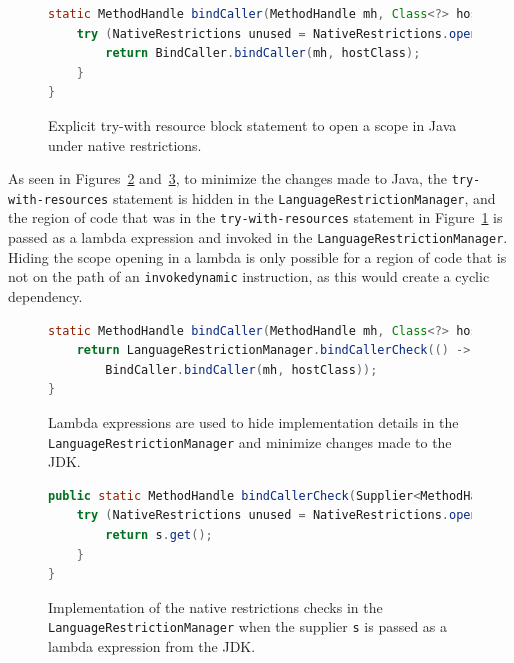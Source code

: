\begin{figure}[ht]
    \centering
\begin{lstlisting}[language=Java]
static MethodHandle bindCaller(MethodHandle mh, Class<?> hostClass) {
    try (NativeRestrictions unused = NativeRestrictions.openScope()) {
        return BindCaller.bindCaller(mh, hostClass);
    }
}
\end{lstlisting}
    \caption{Explicit try-with resource block statement to open a scope in Java under native restrictions.}
    \label{fig:bind_caller_twr}
\end{figure}

As seen in Figures~\ref{fig:bind_caller_lambda} and~\ref{fig:bind_caller_lrm}, to minimize the changes made to Java, the \verb|try-with-resources| statement is hidden in the \verb|LanguageRestrictionManager|, and the region of code that was in the \verb|try-with-resources| statement in Figure~\ref{fig:bind_caller_twr} is passed as a lambda expression and invoked in the \verb|LanguageRestrictionManager|. Hiding the scope opening in a lambda is only possible for a region of code that is not on the path of an \verb|invokedynamic| instruction, as this would create a cyclic dependency. 

\begin{figure}[ht]
    \centering
\begin{lstlisting}[language=Java]
static MethodHandle bindCaller(MethodHandle mh, Class<?> hostClass) {
    return LanguageRestrictionManager.bindCallerCheck(() -> 
        BindCaller.bindCaller(mh, hostClass));
}
\end{lstlisting}
    \caption{Lambda expressions are used to hide implementation details in the \texttt{LanguageRestrictionManager} and minimize changes made to the JDK.}
    \label{fig:bind_caller_lambda}
\end{figure}

\begin{figure}[ht]
    \centering
\begin{lstlisting}[language=Java]
public static MethodHandle bindCallerCheck(Supplier<MethodHandle> s) {
    try (NativeRestrictions unused = NativeRestrictions.openScope()) {
        return s.get();
    }
}
\end{lstlisting}
    \caption{Implementation of the native restrictions checks in the \texttt{LanguageRestrictionManager} when the supplier \texttt{s} is passed as a lambda expression from the JDK.}
    \label{fig:bind_caller_lrm}
\end{figure}


